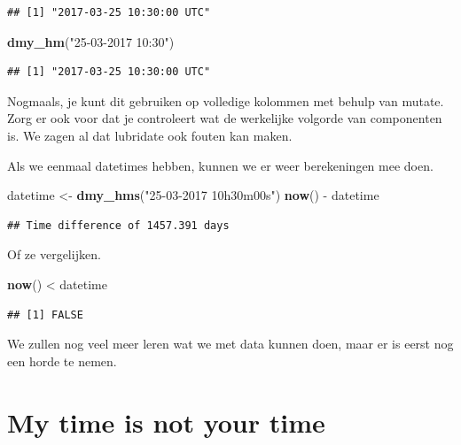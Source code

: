 \documentclass[]{tufte-book}
\newenvironment{Shaded}{}{}
\newcommand{\KeywordTok}[1]{\textcolor[rgb]{0.00,0.44,0.13}{\textbf{#1}}}
\newcommand{\NormalTok}[1]{#1}
\newcommand{\OperatorTok}[1]{\textcolor[rgb]{0.40,0.40,0.40}{#1}}
\newcommand{\StringTok}[1]{\textcolor[rgb]{0.25,0.44,0.63}{#1}}
\begin{document}
\begin{verbatim}
## [1] "2017-03-25 10:30:00 UTC"
\end{verbatim}

\begin{Shaded}
\begin{Highlighting}[]
\KeywordTok{dmy_hm}\NormalTok{(}\StringTok{"25-03-2017 10:30"}\NormalTok{)}
\end{Highlighting}
\end{Shaded}

\begin{verbatim}
## [1] "2017-03-25 10:30:00 UTC"
\end{verbatim}

Nogmaals, je kunt dit gebruiken op volledige kolommen met behulp van mutate. Zorg er ook voor dat je controleert wat de werkelijke volgorde van componenten is. We zagen al dat lubridate ook fouten kan maken.

Als we eenmaal datetimes hebben, kunnen we er weer berekeningen mee doen.

\begin{Shaded}
\begin{Highlighting}[]
\NormalTok{datetime <-}\StringTok{ }\KeywordTok{dmy_hms}\NormalTok{(}\StringTok{"25-03-2017 10h30m00s"}\NormalTok{)}
\KeywordTok{now}\NormalTok{() }\OperatorTok{-}\StringTok{ }\NormalTok{datetime}
\end{Highlighting}
\end{Shaded}

\begin{verbatim}
## Time difference of 1457.391 days
\end{verbatim}

Of ze vergelijken.

\begin{Shaded}
\begin{Highlighting}[]
\KeywordTok{now}\NormalTok{() }\OperatorTok{<}\StringTok{ }\NormalTok{datetime}
\end{Highlighting}
\end{Shaded}

\begin{verbatim}
## [1] FALSE
\end{verbatim}

We zullen nog veel meer leren wat we met data kunnen doen, maar er is eerst nog een horde te nemen.

\hypertarget{my-time-is-not-your-time}{%
\section{My time is not your time}\label{my-time-is-not-your-time}}
\end{document}
